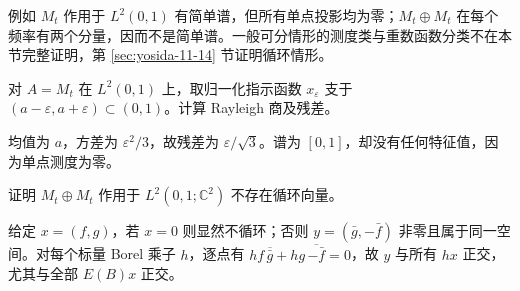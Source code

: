 例如 $M_t$ 作用于 $L^2(0,1)$ 有简单谱，但所有单点投影均为零；$M_t\oplus M_t$ 在每个频率有两个分量，因而不是简单谱。一般可分情形的测度类与重数函数分类不在本节完整证明，第 \ref{sec:yosida-11-14} 节证明循环情形。

\begin{exercise}[残差不保证特征值]\label{ex:y11-residual}
对 $A=M_t$ 在 $L^2(0,1)$ 上，取归一化指示函数 $x_\varepsilon$ 支于 $(a-\varepsilon,a+\varepsilon)\subset(0,1)$。计算 Rayleigh 商及残差。
\end{exercise}
\begin{solution}
均值为 $a$，方差为 $\varepsilon^2/3$，故残差为 $\varepsilon/\sqrt3$。谱为 $[0,1]$，却没有任何特征值，因为单点测度为零。
\end{solution}

\begin{exercise}[循环与重数二]\label{ex:y11-multiplicity}
证明 $M_t\oplus M_t$ 作用于 $L^2(0,1;\mathbb C^2)$ 不存在循环向量。
\end{exercise}
\begin{solution}
给定 $x=(f,g)$，若 $x=0$ 则显然不循环；否则 $y=(\bar g,-\bar f)$ 非零且属于同一空间。对每个标量 Borel 乘子 $h$，逐点有 $hf\,\overline{\bar g}+hg\,\overline{-\bar f}=0$，故 $y$ 与所有 $h x$ 正交，尤其与全部 $E(B)x$ 正交。
\end{solution}
